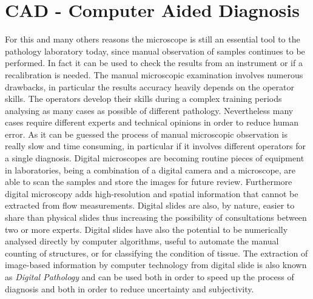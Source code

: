\documentclass[final,a4paper,12pt,english]{UnicaPhdThesis3}
\begin{document}
\section{CAD - Computer Aided Diagnosis} %
For this and many others reasons the microscope is still an essential tool to the pathology laboratory today, since manual observation of samples continues to be performed. In fact it can be used to check the results from an instrument or if a recalibration is needed. The manual microscopic examination involves numerous drawbacks, in particular the results accuracy heavily depends on the operator skills. The operators develop their skills during a complex training periods analysing as many cases as possible of different pathology. Nevertheless many cases require different experts and technical opinions in order to reduce human error. As it can be guessed the process of manual microscopic observation is really slow and time consuming, in particular if it involves different operators for a single diagnosis. Digital microscopes are becoming routine pieces of equipment in laboratories, being a combination of a digital camera and a microscope, are able to scan the samples and store the images for future review. Furthermore digital microscopy adds high-resolution and spatial information that cannot be extracted from flow measurements. Digital slides are also, by nature, easier to share than physical slides thus increasing the possibility of consultations between two or more experts. Digital slides have also the potential to be numerically analysed directly by computer algorithms, useful to automate the manual counting of structures, or for classifying the condition of tissue. The extraction of image-based information by computer technology from digital slide is also known as \textit{Digital Pathology} and can be used both in order to speed up the process of diagnosis and both in order to reduce uncertainty and subjectivity.
\end{document}
